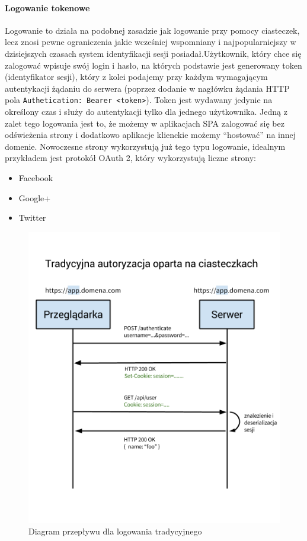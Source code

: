 \documentclass[10pt,titlepage]{article}
\begin{document}
\paragraph{Logowanie tokenowe}
Logowanie to działa na podobnej zasadzie jak logowanie przy pomocy ciasteczek, lecz znosi pewne ograniczenia jakie wcześniej wspomniany i najpopularniejszy w dzisiejszych czasach system identyfikacji sesji posiadał.Użytkownik, który chce się zalogować wpisuje swój login i hasło, na których podstawie jest generowany token (identyfikator sesji), który z kolei podajemy przy każdym wymagającym autentykacji żądaniu do serwera (poprzez dodanie w nagłówku żądania HTTP pola \verb|Authetication: Bearer <token>|). Token jest wydawany jedynie na określony czas i służy do autentykacji tylko dla jednego użytkownika. Jedną z zalet tego logowania jest to, że możemy \linebreak w aplikacjach SPA zalogować się bez odświeżenia strony i dodatkowo aplikacje klienckie możemy ``hostować'' na innej domenie. Nowoczesne strony wykorzystują już tego typu logowanie, idealnym przykładem jest protokół OAuth 2, który wykorzystują liczne strony:
\begin{itemize}
  \item Facebook
  \item Google+
  \item Twitter
\end{itemize}
\begin{figure}[H]
  \centering
  \includegraphics[scale=0.355]{images/tokenAuth1.png}
  \caption{Diagram przepływu dla logowania tradycyjnego}
\end{figure}
\end{document}
